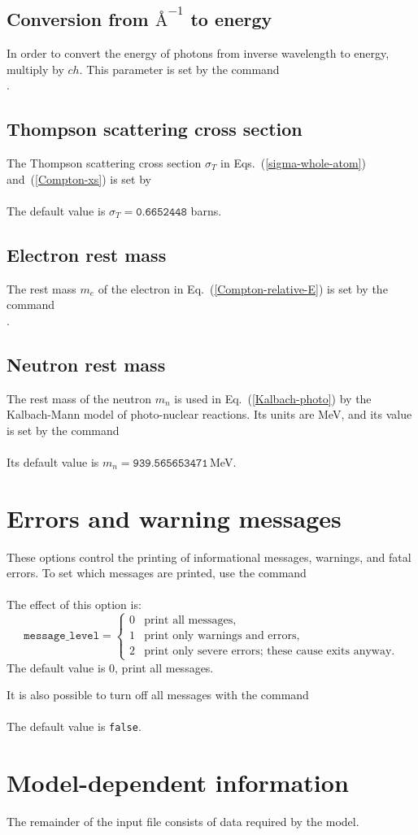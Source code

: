\subsection{Conversion from $\text{\AA}^{-1}$ to energy}\label{Sec:cm-to-Mev}
In order to convert the energy of photons from inverse wavelength
to energy, multiply by $ch$.  This parameter is set by
the command\\
  .

\subsection{Thompson scattering cross section}\label{Sec:Thompson-xs}
The Thompson scattering cross section $\sigma_T$ in 
Eqs.~(\ref{sigma-whole-atom}) and~(\ref{Compton-xs}) is
set by\\
  \\
The default value is $\sigma_T = \texttt{0.6652448}$ barns.

\subsection{Electron rest mass}\label{Sec:electron-mass}
The rest mass $m_e$ of the electron in Eq.~(\ref{Compton-relative-E}) is
set by the command\\
  .

\subsection{Neutron rest mass}\label{Sec:neutron-mass}
The rest mass of the neutron $m_n$ is used in Eq.~(\ref{Kalbach-photo})
by the Kalbach-Mann model of photo-nuclear reactions.
Its units are MeV, and its value is set by the command\\
  \\
Its default value is $m_n = \texttt{939.565653471}\,$MeV.

\section{Errors and warning messages}
These options control the printing of informational messages,
warnings, and fatal errors.  To set which messages are printed,
use the command\\
  \\
The effect of this option is:
$$
  \texttt{message\_level} =
    \begin{cases}
       0& \text{print all messages},\\
       1& \text{print only warnings and errors},\\
       2& \text{print only severe errors; these cause exits anyway}.
    \end{cases}
$$
The default value is 0, print all messages.

It is also possible to turn off all messages with the command\\
  \\
The default value is \texttt{false}.

\section{Model-dependent information}\label{model-info}
The remainder of the input file consists of data required by the model. 
